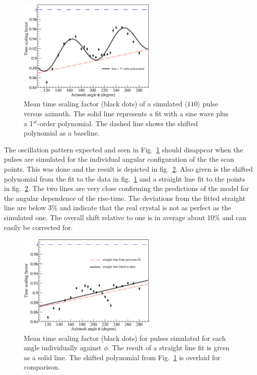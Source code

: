 \begin{figure}[htbp]
\centering
\includegraphics[width=0.6\textwidth]{tsc}
\caption{Mean time scaling factor (black dots) of a simulated $\langle
110 \rangle$ pulse versus azimuth. The solid line represents a fit
with a sine wave plus a 1$^{st}$-order polynomial. The dashed line
shows the shifted polynomial as a baseline.}
\label{fig:psa:tsc}
\end{figure}

The oscillation pattern expected and seen in Fig.~\ref{fig:psa:tsc}
should disappear when the pulses are simulated for the individual
angular configuration of the the scan points. This was done and the
result is depicted in fig.~\ref{fig:psa:tsl}. Also given is the
shifted polynomial from the fit to the data in fig.~\ref{fig:psa:tsc}
and a straight line fit to the points in fig.~\ref{fig:psa:tsl}. The
two lines are very close confirming the predictions of the model for
the angular dependence of the rise-time. The deviations from the
fitted straight line are below 3\% and indicate that the real crystal
is not as perfect as the simulated one. The overall shift relative to
one is in average about 10\% and can easily be corrected for.

\begin{figure}[htbp]
\centering
\includegraphics[width=0.6\textwidth]{tsline}
\caption{Mean time scaling factor (black dots) for pulses simulated
for each angle individually against $\phi$. The result of a straight
line fit is given as a solid line. The shifted polynomial from
Fig.~\ref{fig:psa:tsc} is overlaid for comparison.}
\label{fig:psa:tsl}
\end{figure}


